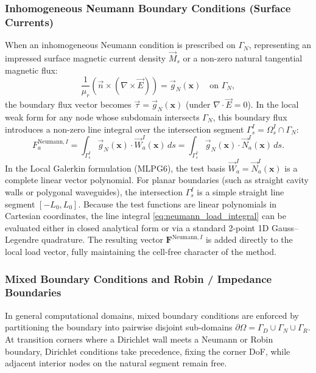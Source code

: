 \documentclass[preprint,12pt]{elsarticle}
\begin{document}
\subsubsection{Inhomogeneous Neumann Boundary Conditions (Surface Currents)}
\label{subsubsec:neumann_inhomogeneous}

When an inhomogeneous Neumann condition is prescribed on $\Gamma_N$, representing an impressed surface magnetic current density $\vec{M}_s$ or a non-zero natural tangential magnetic flux:
\begin{equation}
    \frac{1}{\mu_r} \left( \vec{n} \times (\nabla \times \vec{E}) \right) = \vec{g}_N(\mathbf{x}) \quad \text{on } \Gamma_N,
    \label{eq:neumann_inhomogeneous_pde}
\end{equation}
the boundary flux vector becomes $\vec{\tau} = \vec{g}_N(\mathbf{x})$ (under $\nabla \cdot \vec{E} = 0$). In the local weak form for any node whose subdomain intersects $\Gamma_N$, this boundary flux introduces a non-zero line integral over the intersection segment $\Gamma_s^I = \Omega_s^I \cap \Gamma_N$:
\begin{equation}
    F_a^{\mathrm{Neumann}, I} = \int_{\Gamma_s^I} \vec{g}_N(\mathbf{x}) \cdot \vec{W}_a^I(\mathbf{x}) \, ds = \int_{\Gamma_s^I} \vec{g}_N(\mathbf{x}) \cdot \vec{N}_a^I(\mathbf{x}) \, ds.
    \label{eq:neumann_load_integral}
\end{equation}
In the Local Galerkin formulation (MLPG6), the test basis $\vec{W}_a^I = \vec{N}_a^I(\mathbf{x})$ is a complete linear vector polynomial. For planar boundaries (such as straight cavity walls or polygonal waveguides), the intersection $\Gamma_s^I$ is a simple straight line segment $[-L_0, L_0]$. Because the test functions are linear polynomials in Cartesian coordinates, the line integral \eqref{eq:neumann_load_integral} can be evaluated either in closed analytical form or via a standard 2-point 1D Gauss--Legendre quadrature. The resulting vector $\mathbf{F}^{\mathrm{Neumann}, I}$ is added directly to the local load vector, fully maintaining the cell-free character of the method.

\subsubsection{Mixed Boundary Conditions and Robin / Impedance Boundaries}
\label{subsubsec:mixed_robin_bc}

In general computational domains, mixed boundary conditions are enforced by partitioning the boundary into pairwise disjoint sub-domains $\partial\Omega = \Gamma_D \cup \Gamma_N \cup \Gamma_R$. At transition corners where a Dirichlet wall meets a Neumann or Robin boundary, Dirichlet conditions take precedence, fixing the corner DoF, while adjacent interior nodes on the natural segment remain free.
\end{document}
